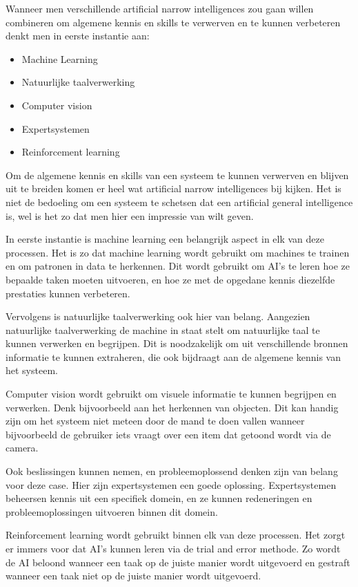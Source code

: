 Wanneer men verschillende artificial narrow intelligences zou gaan willen combineren om algemene kennis en skills te verwerven en te kunnen verbeteren denkt men in eerste instantie aan:

\begin{itemize}
    \item Machine Learning
    \item Natuurlijke taalverwerking
    \item Computer vision
    \item Expertsystemen
    \item Reinforcement learning
\end{itemize}

Om de algemene kennis en skills van een systeem te kunnen verwerven en blijven uit te breiden komen er heel wat artificial narrow intelligences bij kijken. Het is niet de bedoeling om een systeem te schetsen dat een artificial general intelligence is, wel is het zo dat men hier een impressie van wilt geven.

In eerste instantie is machine learning een belangrijk aspect in elk van deze processen. Het is zo dat machine learning wordt gebruikt om machines te trainen en om patronen in data te herkennen. Dit wordt gebruikt om AI's te leren hoe ze bepaalde taken moeten uitvoeren, en hoe ze met de opgedane kennis diezelfde prestaties kunnen verbeteren.

Vervolgens is natuurlijke taalverwerking ook hier van belang. Aangezien natuurlijke taalverwerking de machine in staat stelt om natuurlijke taal te kunnen verwerken en begrijpen. Dit is noodzakelijk om uit verschillende bronnen informatie te kunnen extraheren, die ook bijdraagt aan de algemene kennis van het systeem.

Computer vision wordt gebruikt om visuele informatie te kunnen begrijpen en verwerken. Denk bijvoorbeeld aan het herkennen van objecten. Dit kan handig zijn om het systeem niet meteen door de mand te doen vallen wanneer bijvoorbeeld de gebruiker iets vraagt over een item dat getoond wordt via de camera.

Ook beslissingen kunnen nemen, en probleemoplossend denken zijn van belang voor deze case. Hier zijn expertsystemen een goede oplossing. Expertsystemen beheersen kennis uit een specifiek domein, en ze kunnen redeneringen en probleemoplossingen uitvoeren binnen dit domein.

Reinforcement learning wordt gebruikt binnen elk van deze processen. Het zorgt er immers voor dat AI's kunnen leren via de trial and error methode. Zo wordt de AI beloond wanneer een taak op de juiste manier wordt uitgevoerd en gestraft wanneer een taak niet op de juiste manier wordt uitgevoerd.

